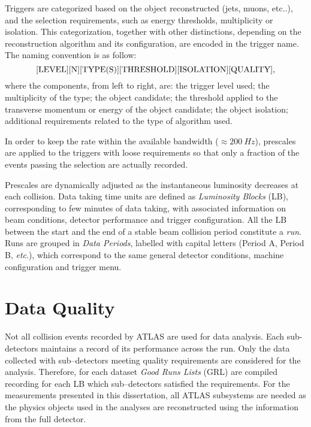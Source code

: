 Triggers are categorized based on the object reconstructed (jets,
muons, etc..), and the selection requirements, such as energy
thresholds, multiplicity or isolation. This categorization, together
with other distinctions, depending on the reconstruction algorithm and
its configuration, are encoded in the trigger name.
The naming convention is as follow:
\begin{equation*}\label{eq:}
{\rm [LEVEL][N][TYPE(S)][THRESHOLD][ISOLATION][QUALITY]},
\end{equation*}
where the components, from left to right, are: the trigger level used; the
multiplicity of the type; the object candidate; the threshold applied to
the transverse momentum or energy of the object candidate; the object isolation;
additional requirements related to the type of algorithm used.

In order to keep the rate within the available bandwidth ($\approx{}200~Hz$), 
prescales are applied to the triggers with loose requirements so that
only a fraction of the events passing the selection are actually recorded.

Prescales are dynamically adjusted as the instantaneous luminosity
decreases at each collision. Data taking time units are defined as
{\it Luminosity Blocks} (LB), corresponding to few minutes of  data
taking, with associated information on beam conditions, detector performance 
and trigger configuration. All the LB between the start and the
end of a stable beam collision period constitute a {\it run}. Runs are grouped
in {\it Data Periods}, labelled with capital letters (Period A, Period B, {\it etc}.),
which correspond to the same general detector conditions, machine configuration and
trigger menu.

\section{Data Quality}
\label{sec:daq}

Not all collision events recorded by ATLAS are used for data analysis.
Each sub-detectors maintains a record of its performance across the
run. Only the data collected with sub--detectors meeting quality
requirements are considered for the analysis. Therefore, for each dataset
{\it Good Runs Lists} (GRL) are compiled recording for each LB which
sub--detectors satisfied the requirements.
For the measurements presented in this dissertation, all ATLAS subsystems
are needed as the physics objects used in the analyses are reconstructed
using the information from the full detector. 

